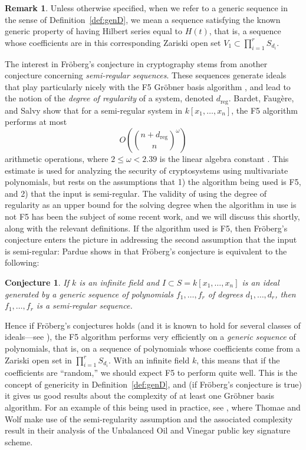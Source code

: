 \documentclass[11pt]{article}
\newcommand{\dreg}{d_{\text{reg}}}
\newtheorem{conjecture}{Conjecture}
\theoremstyle{definition}
\newtheorem{remark}{Remark}
\begin{document}
\begin{remark}
	Unless otherwise specified, when we refer to a generic sequence in the sense of Definition~\ref{def:genD}, we mean a sequence satisfying the known generic property of having Hilbert series equal to $H(t)$, that is, a sequence whose coefficients are in this corresponding Zariski open set $V_1 \subset \prod_{i = 1}^r S_{d_i}$.
\end{remark}


The interest in Fröberg's conjecture in cryptography stems from another conjecture concerning \emph{semi-regular sequences}. These sequences generate ideals that play particularly nicely with the F5 Gröbner basis algorithm \cite{faugere2002new}, and lead to the notion of the \emph{degree of regularity} of a system, denoted $\dreg$. Bardet, Faugère, and Salvy show that for a semi-regular system in $k[x_1, \dots, x_n]$, the F5 algorithm performs at most \[ O\left( \binom{n + \dreg}{n}^\omega \right) \] arithmetic operations, where $2 \leq \omega < 2.39$ is the linear algebra constant \cite{bardet2004complexity}. This estimate is used for analyzing the security of cryptosystems using multivariate polynomials, but rests on the assumptions that 1) the algorithm being used is F5, and 2) that the input is semi-regular. The validity of using the degree of regularity as an upper bound for the solving degree when the algorithm in use is not F5 has been the subject of some recent work, and we will discuss this shortly, along with the relevant definitions. If the algorithm used is F5, then Fröberg's conjecture enters the picture in addressing the second assumption that the input is semi-regular: Pardue shows in \cite{pardue2010generic} that Fröberg's conjecture is equivalent to the following:


\begin{conjecture}\label{Fr:equiv}
	If $k$ is an infinite field and $I \subset S = k[x_1, \dots, x_n]$ is an ideal generated by a generic sequence of polynomials $f_1, \dots, f_r$ of degrees $d_1, \dots, d_r$, then $f_1, \dots, f_r$ is a semi-regular sequence. 
\end{conjecture}


Hence if Fröberg's conjectures holds (and it is known to hold for several classes of ideals---see \cite{TRUNG201979}), the F5 algorithm performs very efficiently on a \emph{generic sequence} of polynomials, that is, on a sequence of polynomials whose coefficients come from a Zariski open set in $\prod_{i = 1}^r S_{d_i}$. With an infinite field $k$, this means that if the coefficients are ``random,'' we should expect F5 to perform quite well. This is the concept of genericity in Definition~\ref{def:genD}, and (if Fröberg's conjecture is true) it gives us good results about the complexity of at least one Gröbner basis algorithm. For an example of this being used in practice, see \cite{thomae2012solving}, where Thomae and Wolf make use of the semi-regularity assumption and the associated complexity result in their analysis of the Unbalanced Oil and Vinegar public key signature scheme. 
\end{document}
